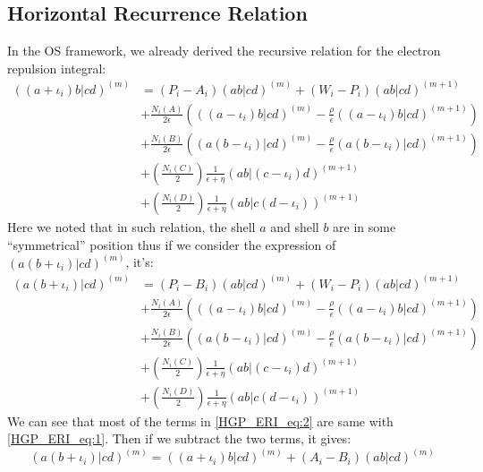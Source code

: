 \subsection{Horizontal Recurrence Relation}
In the OS framework, we already derived the recursive relation for the electron
repulsion integral:
\begin{equation}
 \begin{split}
 ((a+\iota_{i})b|cd)^{(m)} &= (P_{i} - A_{i})(ab|cd)^{(m)} +
\left(W_{i} -P_{i}\right)(ab|cd)^{(m+1)} \\
&+\frac{N_{i}(A)}{2\epsilon}\left(((a-\iota_{i})b|cd)^{(m)}-\frac{\rho}{
\epsilon }((a-\iota_{i})b|cd)^{(m+1)}\right)  \\
&+\frac{N_{i}(B)}{2\epsilon}\left((a(b-\iota_{i})|cd)^{(m)}-\frac{\rho}{
\epsilon }(a(b-\iota_{i})|cd)^{(m+1)}\right)  \\
&+\left(\frac{N_{i}(C)}{2}\right)\frac{1}{\epsilon+\eta}
(ab|(c-\iota_{i})d)^{(m+1)} \\
&+\left(\frac{N_{i}(D)}{2}\right)\frac{1}{\epsilon+\eta}
(ab|c(d-\iota_{i}))^{(m+1)} 
 \end{split}
\label{HGP_ERI_eq:1}
\end{equation}
Here we noted that in such relation, the shell $a$ and shell $b$ are in some
``symmetrical'' position thus if we consider the expression of
$(a(b+\iota_{i})|cd)^{(m)}$, it's:
\begin{equation}
\begin{split}
 (a(b+\iota_{i})|cd)^{(m)} &= (P_{i} - B_{i})(ab|cd)^{(m)} +
\left(W_{i} -P_{i}\right)(ab|cd)^{(m+1)} \\
&+\frac{N_{i}(A)}{2\epsilon}\left(((a-\iota_{i})b|cd)^{(m)}-\frac{\rho}{
\epsilon }((a-\iota_{i})b|cd)^{(m+1)}\right)  \\
&+\frac{N_{i}(B)}{2\epsilon}\left((a(b-\iota_{i})|cd)^{(m)}-\frac{\rho}{
\epsilon }(a(b-\iota_{i})|cd)^{(m+1)}\right)  \\
&+\left(\frac{N_{i}(C)}{2}\right)\frac{1}{\epsilon+\eta}
(ab|(c-\iota_{i})d)^{(m+1)} \\
&+\left(\frac{N_{i}(D)}{2}\right)\frac{1}{\epsilon+\eta}
(ab|c(d-\iota_{i}))^{(m+1)} 
 \end{split}
\label{HGP_ERI_eq:2} 
\end{equation}
We can see that most of the terms in \ref{HGP_ERI_eq:2} are same with
\ref{HGP_ERI_eq:1}. Then if we subtract the two terms, it gives:
\begin{equation}
 \label{HGP_ERI_HRR}
 (a(b+\iota_{i})|cd)^{(m)} = ((a+\iota_{i})b|cd)^{(m)} + 
(A_{i} - B_{i})(ab|cd)^{(m)}
\end{equation}
